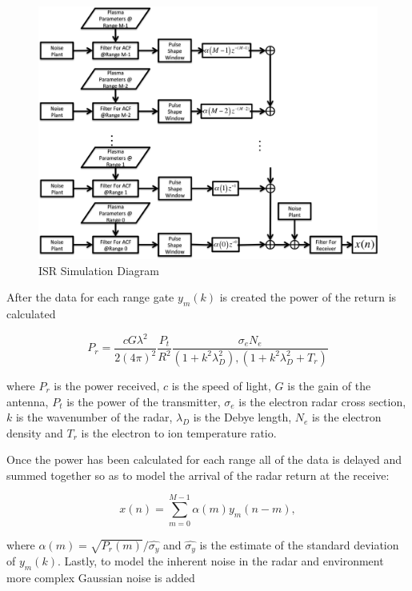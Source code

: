 \documentclass[draft,ras]{agutex}
\begin{document}
\begin{article}
\begin{figure}[!h]
\centering
\includegraphics[width=7.0in]{diagram}
\caption{ISR Simulation Diagram}
\label{fig:isrdiag}
\end{figure}


After the data for each range gate $y_m(k)$ is created the power of the return is calculated

\begin{equation}
\label{eq3}
P_r = \frac{cG \lambda^2}{2(4\pi)^2}\frac{P_t }{R^2}\frac{\sigma_e N_e}{(1+k^2\lambda_D^2),(1+k^2\lambda_D^2 + T_r)}
\end{equation}
 
 \noindent where $P_r$ is the power received, $c$ is the speed of light, $G$ is the gain of the antenna, $P_t$ is the power of the transmitter, $\sigma_e$ is the electron radar cross section, $k$ is the wavenumber of the radar, $\lambda_D$ is the Debye length, $N_e$ is the electron density and $T_r$ is the electron to ion temperature ratio.
  
Once the power has been calculated for each range all of the data is delayed and summed together so as to model the arrival of the radar return at the receive: 
 
\begin{equation}
\label{eq4}
x(n) = \displaystyle\sum\limits_{m =0}^{M-1} \alpha(m)y_m(n-m),
\end{equation}

\noindent where $\alpha(m) = \sqrt{P_r(m)}/\hat{\sigma_y}$ and $\hat{\sigma_y}$ is the estimate of the standard deviation of $y_m(k)$. Lastly, to model the inherent noise in the radar and environment more complex Gaussian noise is added


\end{article}
\end{document}
